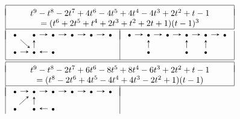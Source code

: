 \documentclass[11pt, letterpaper]{amsart}
\theoremstyle{definition}
\numberwithin{equation}{section}
\begin{document}
\begin{figure}[ht]
\begin{equation*}
\begin{array}{|l|l|} 
\hline
\multicolumn{2}{|c|}{}\\[-8pt]
\multicolumn{2}{|c|}{t^9 - t^8 - 2t^7 + 4t^6 - 4t^5 + 4t^4 - 4t^3 + 2t^2 + t - 1}\\
\multicolumn{2}{|c|}{=(t^6 + 2t^5 + t^4 + 2t^3 + t^2 + 2t + 1)(t - 1)^3} \\
\hline
\ \\[-10pt]
\begin{tikzcd}[arrows={-stealth}, sep=1em]
  \scriptstyle\bullet  \arrow[dr]   & \scriptstyle\bullet  \arrow[r] & \scriptstyle\bullet \arrow[r] & \scriptstyle\bullet \arrow[r] & \scriptstyle\bullet \arrow[r] & \scriptstyle\bullet \\
 \scriptstyle\bullet  \arrow[r] & \scriptstyle\bullet  \arrow[u] &  \scriptstyle\bullet \arrow[l]
   & & &
\end{tikzcd}
& 
\begin{tikzcd}[arrows={-stealth}, sep=1em]
  \scriptstyle\bullet  \arrow[r]   & \scriptstyle\bullet  \arrow[r] & \scriptstyle\bullet \arrow[r] & \scriptstyle\bullet \arrow[r] & \scriptstyle\bullet \arrow[r] & \scriptstyle\bullet \\
 & \scriptstyle\bullet  \arrow[u] &  & \scriptstyle\bullet \arrow[u] & \scriptstyle\bullet \arrow[u] & 
\end{tikzcd}
\\[15pt]
\hline
\multicolumn{2}{c}{}\\[-10pt]
\hline
\multicolumn{2}{|c|}{}\\[-8pt]
\multicolumn{2}{|c|}{t^9 - t^8 - 2t^7 + 6t^6 - 8t^5 + 8t^4 - 6t^3 + 2t^2 + t - 1}\\
\multicolumn{2}{|c|}{=(t^8 - 2t^6 + 4t^5 - 4t^4 + 4t^3 - 2t^2 + 1)(t - 1)} \\
\hline
\ \\[-10pt]
\begin{tikzcd}[arrows={-stealth}, sep=1em]
  \scriptstyle\bullet  \arrow[r]   & \scriptstyle\bullet  \arrow[r] & \scriptstyle\bullet \arrow[r] & \scriptstyle\bullet \arrow[r] & \scriptstyle\bullet \arrow[r] & \scriptstyle\bullet \\
 \scriptstyle\bullet  \arrow[ur] & \scriptstyle\bullet  \arrow[u] &  \scriptstyle\bullet \arrow[l]
   & & &
\end{tikzcd}

\end{array}
\end{equation*}
\end{figure}
\end{document}

